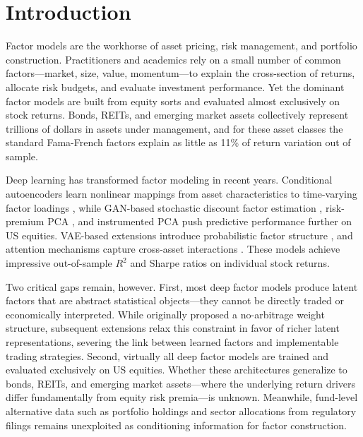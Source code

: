 \section{Introduction}
\label{sec:intro}

Factor models are the workhorse of asset pricing, risk management, and portfolio construction. Practitioners and academics rely on a small number of common factors---market, size, value, momentum---to explain the cross-section of returns, allocate risk budgets, and evaluate investment performance. Yet the dominant factor models are built from equity sorts and evaluated almost exclusively on stock returns. Bonds, REITs, and emerging market assets collectively represent trillions of dollars in assets under management, and for these asset classes the standard Fama-French factors explain as little as 11\% of return variation out of sample.%

Deep learning has transformed factor modeling in recent years. Conditional autoencoders learn nonlinear mappings from asset characteristics to time-varying factor loadings \citep{GuKellyXiu2021autoencoder}, while GAN-based stochastic discount factor estimation \citep{ChenPelgerZhu2024deep}, risk-premium PCA \citep{LettauPelger2020factors}, and instrumented PCA \citep{KellyPruittSu2019ipca} push predictive performance further on US equities. VAE-based extensions introduce probabilistic factor structure \citep{Duan2022factorvae}, and attention mechanisms capture cross-asset interactions \citep{Epstein2025attention}. These models achieve impressive out-of-sample $R^2$ and Sharpe ratios on individual stock returns.

Two critical gaps remain, however. First, most deep factor models produce latent factors that are abstract statistical objects---they cannot be directly traded or economically interpreted. While \citet{GuKellyXiu2021autoencoder} originally proposed a no-arbitrage weight structure, subsequent extensions relax this constraint in favor of richer latent representations, severing the link between learned factors and implementable trading strategies. Second, virtually all deep factor models are trained and evaluated exclusively on US equities. Whether these architectures generalize to bonds, REITs, and emerging market assets---where the underlying return drivers differ fundamentally from equity risk premia---is unknown. Meanwhile, fund-level alternative data such as portfolio holdings and sector allocations from regulatory filings remains unexploited as conditioning information for factor construction.

